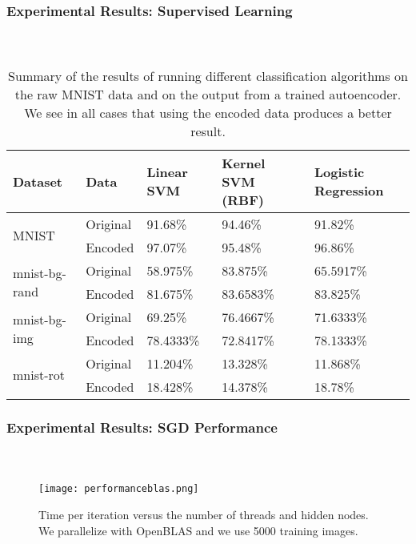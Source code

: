 \begin{frame}[t]
	\frametitle{Experimental Results: Supervised Learning}
	\framesubtitle{~~}  %


\begin{table}[h]
  \centering
\begin{tabular}{ll|lll}
    Dataset                        & Data               & Linear SVM & Kernel SVM (RBF) & Logistic Regression \\ \hline
    \multirow{2}{*}{MNIST}         & Original           & 91.68\%    & 94.46\%          & 91.82\%             \\
                                   & Encoded            & 97.07\%    & 95.48\%          & 96.86\%             \\ \hline
    \multirow{2}{*}{mnist-bg-rand} & Original           & 58.975\%   & 83.875\%         & 65.5917\%           \\
                                   & Encoded            & 81.675\%   & 83.6583\%        & 83.825\%            \\ \hline
    \multirow{2}{*}{mnist-bg-img}  & Original           & 69.25\%    & 76.4667\%        & 71.6333\%           \\
                                   & Encoded            & 78.4333\%  & 72.8417\%        & 78.1333\%           \\ \hline
    \multirow{2}{*}{mnist-rot}     & Original           & 11.204\%   & 13.328\%         & 11.868\%           \\
                                   & Encoded            & 18.428\%   & 14.378\%         & 18.78\%
\end{tabular}
  \caption{Summary of the results of running different classification algorithms on the raw MNIST data and on the output from a trained autoencoder. We
  see in all cases that using the encoded data produces a better result.}
  \label{tab:classvsenc}
\end{table}

\end{frame}


\begin{frame}[t]
	\frametitle{Experimental Results: SGD Performance}
	\framesubtitle{~~}  %

	\begin{figure}[h]
		\centering
		\texttt{[image: performanceblas.png]}
		\caption{Time per iteration versus the number of threads and hidden nodes. We parallelize with OpenBLAS and we use 5000 training images.}
		\label{fig:performanceblas}
	\end{figure}

\end{frame}


